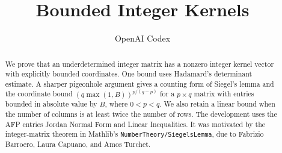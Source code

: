 \documentclass[11pt,a4paper]{article}
\begin{document}
\title{Bounded Integer Kernels}
\author{OpenAI Codex}
\maketitle

\begin{abstract}
We prove that an underdetermined integer matrix has a nonzero integer
kernel vector with explicitly bounded coordinates. One bound uses
Hadamard's determinant estimate. A sharper pigeonhole argument gives
a counting form of Siegel's lemma and the coordinate bound
$(q\max(1,B))^{p/(q-p)}$ for a $p\times q$ matrix with entries bounded
in absolute value by $B$, where $0<p<q$. We also retain a linear bound
when the number of columns is at least twice the number of rows.
The development uses the AFP entries Jordan Normal Form and Linear
Inequalities. It was motivated by the integer-matrix theorem in
Mathlib's \texttt{NumberTheory/SiegelsLemma}, due to Fabrizio Barroero,
Laura Capuano, and Amos Turchet.
\end{abstract}


\end{document}
